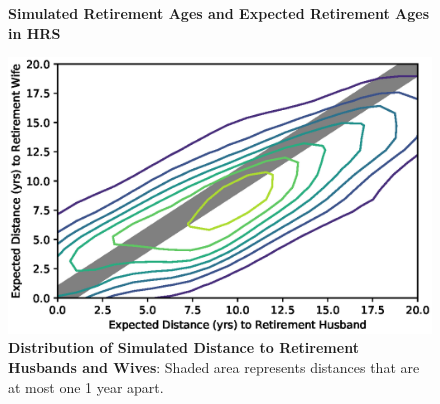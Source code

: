 \documentclass[11pt,letter]{article}
\begin{document}
\begin{figure}[!htbp]
\centering
{}
\caption{\textbf{Simulated Retirement Ages and Expected Retirement Ages in HRS}}
\label{fig:match}
\end{figure}

\begin{figure}[!htbp]
\centering
\includegraphics[scale=0.75]{figures/distances.eps}
\caption{\textbf{Distribution of Simulated Distance to Retirement Husbands and Wives}: Shaded area represents distances that are at most one 1 year apart.}
\label{fig:distances}
\end{figure}
\end{document}
